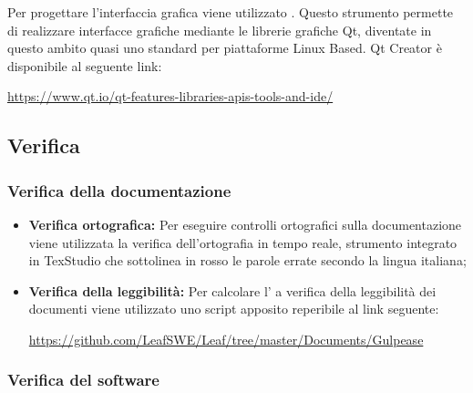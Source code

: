 \documentclass[../NormediProgetto.tex]{subfiles}
\begin{document}
	Per progettare l'interfaccia grafica viene utilizzato . Questo strumento permette di realizzare interfacce grafiche mediante le librerie grafiche Qt, diventate in questo ambito quasi uno standard per piattaforme Linux Based. Qt Creator è disponibile al seguente link: 
	\begin{center}
		\centerline{\url{https://www.qt.io/qt-features-libraries-apis-tools-and-ide/}}
	\end{center}
	
	
	\subsection{Verifica}
	
	\subsubsection{Verifica della documentazione}
	
	\begin{itemize}
		\item \textbf{Verifica ortografica:} Per eseguire controlli ortografici sulla documentazione viene utilizzata la verifica dell’ortografia in tempo reale, strumento integrato in TexStudio che sottolinea in rosso le parole errate secondo la lingua italiana;
		
		\item \textbf{Verifica della leggibilità:} Per calcolare l' a verifica della leggibilità dei documenti viene utilizzato uno script apposito reperibile al link seguente:
		
		\begin{center}
			\centerline{\url{https://github.com/LeafSWE/Leaf/tree/master/Documents/Gulpease}}
		\end{center}
	\end{itemize}
	
	\subsubsection{Verifica del software}
	
\end{document}
